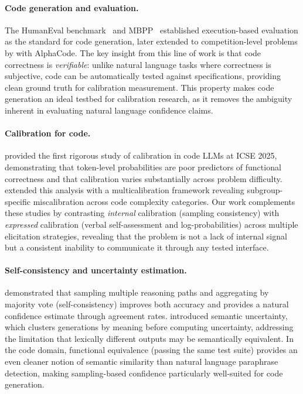 \documentclass{article}
\begin{document}
\paragraph{Code generation and evaluation.}
The HumanEval benchmark~\citep{chen2021evaluating} and MBPP~\citep{austin2021program} established execution-based evaluation as the standard for code generation, later extended to competition-level problems by \citet{li2022competition} with AlphaCode. The key insight from this line of work is that code correctness is \emph{verifiable}: unlike natural language tasks where correctness is subjective, code can be automatically tested against specifications, providing clean ground truth for calibration measurement. This property makes code generation an ideal testbed for calibration research, as it removes the ambiguity inherent in evaluating natural language confidence claims.

\paragraph{Calibration for code.}
\citet{spiess2025calibration} provided the first rigorous study of calibration in code LLMs at ICSE 2025, demonstrating that token-level probabilities are poor predictors of functional correctness and that calibration varies substantially across problem difficulty. \citet{campos2025multicalibration} extended this analysis with a multicalibration framework revealing subgroup-specific miscalibration across code complexity categories. Our work complements these studies by contrasting \emph{internal} calibration (sampling consistency) with \emph{expressed} calibration (verbal self-assessment and log-probabilities) across multiple elicitation strategies, revealing that the problem is not a lack of internal signal but a consistent inability to communicate it through any tested interface.

\paragraph{Self-consistency and uncertainty estimation.}
\citet{wang2023selfconsistency} demonstrated that sampling multiple reasoning paths and aggregating by majority vote (self-consistency) improves both accuracy and provides a natural confidence estimate through agreement rates. \citet{kuhn2023semantic} introduced semantic uncertainty, which clusters generations by meaning before computing uncertainty, addressing the limitation that lexically different outputs may be semantically equivalent. In the code domain, functional equivalence (passing the same test suite) provides an even cleaner notion of semantic similarity than natural language paraphrase detection, making sampling-based confidence particularly well-suited for code generation.
\end{document}
